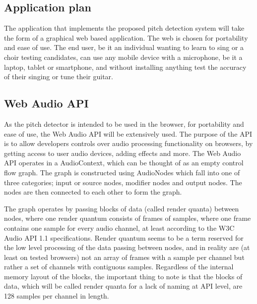 \subsection{Application plan}
The application that implements the proposed pitch detection system will take the form of a graphical web based application. The web is chosen for portability and ease of use. The end user, be it an individual wanting to learn to sing or a choir testing candidates, can use any mobile device with a microphone, be it a laptop, tablet or smartphone, and without installing anything test the accuracy of their singing or tune their guitar.

\subsection{Web Audio API}
As the pitch detector is intended to be used in the browser, for portability and ease of use, the Web Audio API will be extensively used. The purpose of the API is to allow developers controls over audio processing functionality on browsers, by getting access to user audio devices, adding effects and more. 
The Web Audio API operates in a AudioContext, which can be thought of as an empty control flow graph. The graph is constructed using AudioNodes which fall into one of three categories; input or source nodes, modifier nodes and output nodes. The nodes are then connected to each other to form the graph. 

The graph operates by passing blocks of data (called render quanta) between nodes, where one render quantum consists of frames of samples, where one frame contains one sample for every audio channel, at least according to the W3C Audio API 1.1 specifications. Render quantum seems to be a term reserved for the low level processing of the data passing between nodes, and in reality are (at least on tested browsers) not an array of frames with a sample per channel but rather a set of channels with contiguous samples. Regardless of the internal memory layout of the blocks, the important thing to note is that the blocks of data, which will be called render quanta for a lack of naming at API level, are 128 samples per channel in length.


